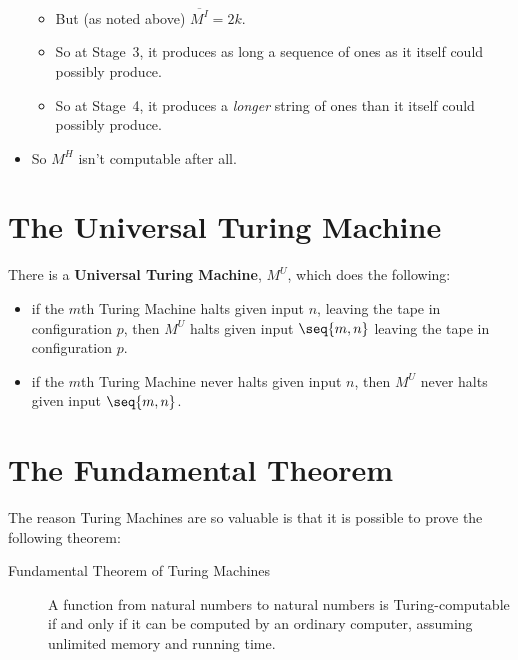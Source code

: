 \documentclass[12pt]{extarticle}
\begin{document}
\begin{itemize}
\begin{itemize}
\item But (as noted above) $\overline{M^I} = 2k$. 

\item So at Stage~3, it produces as long a sequence of ones as it itself could possibly produce. 

\item So at Stage~4, it produces a \emph{longer} string of ones than it itself could possibly produce.

\end{itemize}



\item So $M^H$ isn't computable after all.


\end{itemize}




\section{The Universal Turing Machine}

There is a \textbf{Universal Turing Machine}, \(M^U\), which does the following:

\begin{itemize}
\item if the \(m\)th Turing Machine halts given input \(n\), leaving the tape in configuration \(p\), then
     \(M^U\) halts given input \(\seq{m,n}\) leaving the tape in configuration \(p\).
     
     \item if the \(m\)th Turing Machine never halts given input $n$, then \(M^U\) never halts given input \(\seq{m,n}\).
\end{itemize}


\clearpage

\section{The Fundamental Theorem}

The reason Turing Machines are so valuable is that it is possible to prove the following theorem:

\begin{description}
\item[Fundamental Theorem of Turing Machines]
A function from natural numbers to natural numbers is Turing-computable if and only if it can be computed by an ordinary computer, assuming unlimited memory and running time.

\end{description}
\end{document}
